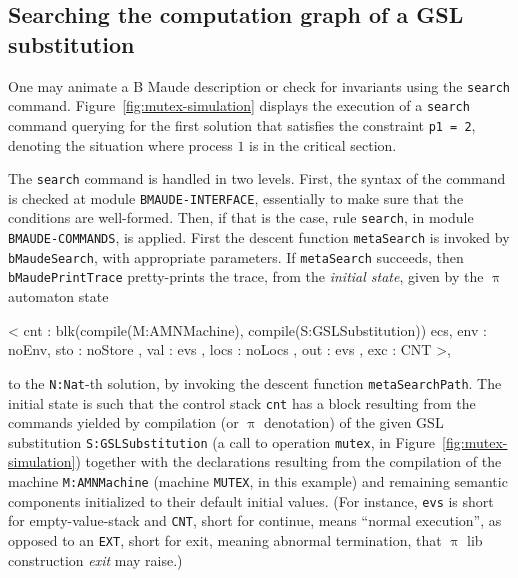 \documentclass[a4paper,openany]{book}
\begin{document}
\subsection{Searching the computation graph of a GSL substitution} \label{sec:search}
One may animate a B Maude description or check for invariants using the \texttt{search} command. Figure~\ref{fig:mutex-simulation} displays the execution of a \texttt{search} command querying for the first solution that satisfies the constraint \texttt{p1 = 2}, denoting the situation where process $1$ is in the critical section. 

The \texttt{search} command is handled in two levels. First, the syntax of the command is checked at module \texttt{BMAUDE-INTERFACE}, essentially to make sure that the conditions are well-formed. Then, if that is the case, rule \texttt{search}, in module \texttt{BMAUDE-COM\-MANDS}, is applied. First the descent function \texttt{metaSearch} is invoked by \texttt{bMaudeSearch}, with appropriate parameters. If \texttt{metaSearch} succeeds, then \texttt{bMaudePrintTrace} pret\-ty-prints the trace, from the \emph{initial state}, given by the $\uppi$ automaton state
\begin{maude}[caption=Initial state for \texttt{metaSearch}, label=lst:initial-state]
< cnt : blk(compile(M:AMNMachine), compile(S:GSLSubstitution)) ecs,
  env : noEnv, sto : noStore , val : evs ,
  locs : noLocs , out : evs , exc : CNT >,
\end{maude}
to the \texttt{N:Nat}-th solution, by invoking the descent function \texttt{metaSearchPath}. The initial state is such that the control stack \texttt{cnt} has a block resulting from the commands yielded by compilation (or $\uppi$ denotation) of the given GSL substitution \texttt{S:GSL\-Subs\-ti\-tu\-ti\-on} (a call to operation \texttt{mutex}, in Figure~\ref{fig:mutex-simulation}) together with the declarations resulting from the compilation of the machine \texttt{M:AMNMachine} (machine \texttt{MUTEX}, in this example) and remaining semantic components initialized to their default initial values. (For instance, \texttt{evs} is short for empty-value-stack and \texttt{CNT}, short for continue, means ``normal execution'', as opposed to an \texttt{EXT}, short for exit, meaning abnormal termination, that $\uppi$ lib construction \emph{exit} may raise.)
\end{document}
